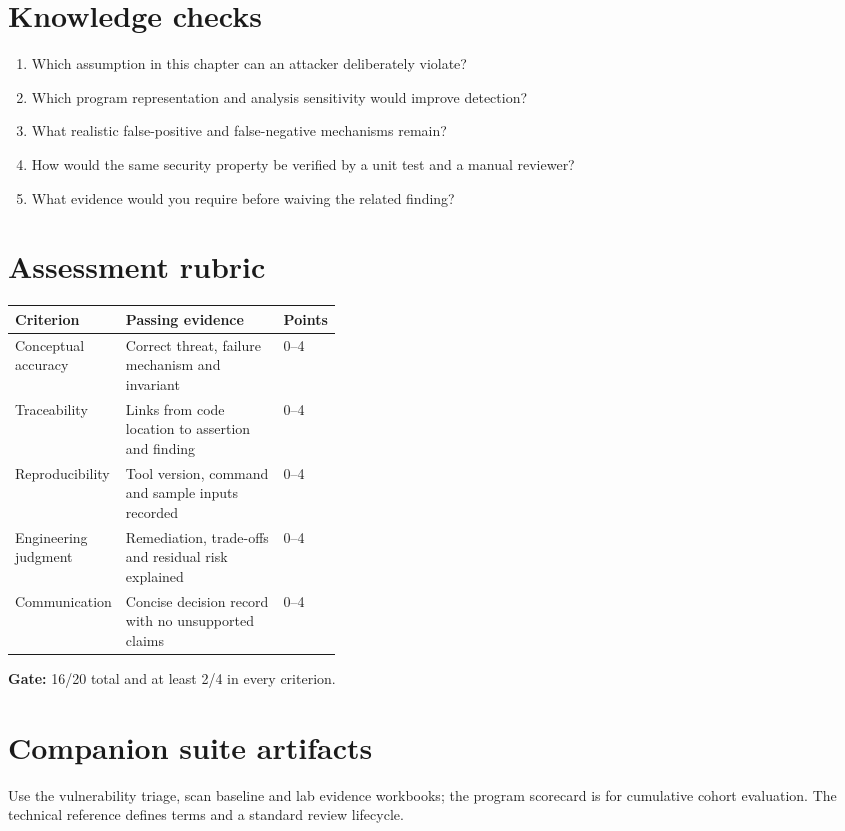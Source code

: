\documentclass[10pt,letterpaper]{article}
\begin{document}
\section{Knowledge checks}
\begin{enumerate}
\item Which assumption in this chapter can an attacker deliberately violate?
\item Which program representation and analysis sensitivity would improve detection?
\item What realistic false-positive and false-negative mechanisms remain?
\item How would the same security property be verified by a unit test and a manual reviewer?
\item What evidence would you require before waiving the related finding?
\end{enumerate}

\section{Assessment rubric}
\begin{tabularx}{\linewidth}{@{}p{0.22\linewidth}Yp{0.16\linewidth}@{}}\toprule
Criterion & Passing evidence & Points\\\midrule
Conceptual accuracy & Correct threat, failure mechanism and invariant & 0--4\\
Traceability & Links from code location to assertion and finding & 0--4\\
Reproducibility & Tool version, command and sample inputs recorded & 0--4\\
Engineering judgment & Remediation, trade-offs and residual risk explained & 0--4\\
Communication & Concise decision record with no unsupported claims & 0--4\\\bottomrule
\end{tabularx}\par
\textbf{Gate:} 16/20 total and at least 2/4 in every criterion.
\section{Companion suite artifacts}
Use the vulnerability triage, scan baseline and lab evidence workbooks; the program scorecard is for cumulative cohort evaluation. The technical reference defines terms and a standard review lifecycle.
\end{document}

